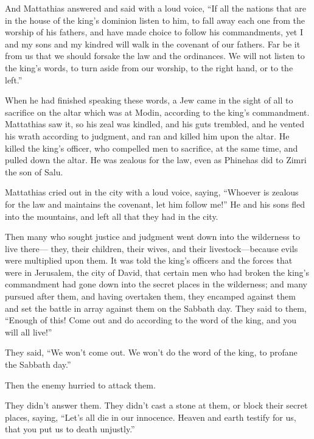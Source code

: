  And Mattathias answered and said with a loud voice, ``If
all the nations that are in the house of the king's dominion listen to
him, to fall away each one from the worship of his fathers, and have
made choice to follow his commandments,  yet I and my
sons and my kindred will walk in the covenant of our fathers.
 Far be it from us that we should forsake the law and the
ordinances.  We will not listen to the king's words, to
turn aside from our worship, to the right hand, or to the left.''

 When he had finished speaking these words, a Jew came in
the sight of all to sacrifice on the altar which was at Modin, according
to the king's commandment.  Mattathias saw it, so his
zeal was kindled, and his guts trembled, and he vented his wrath
according to judgment, and ran and killed him upon the altar.
 He killed the king's officer, who compelled men to
sacrifice, at the same time, and pulled down the altar. 
He was zealous for the law, even as Phinehas did to Zimri the son of
Salu.

 Mattathias cried out in the city with a loud voice,
saying, ``Whoever is zealous for the law and maintains the covenant, let
him follow me!''  He and his sons fled into the
mountains, and left all that they had in the city.

 Then many who sought justice and judgment went down into
the wilderness to live there---  they, their children,
their wives, and their livestock---because evils were multiplied upon
them.  It was told the king's officers and the forces
that were in Jerusalem, the city of David, that certain men who had
broken the king's commandment had gone down into the secret places in
the wilderness;  and many pursued after them, and having
overtaken them, they encamped against them and set the battle in array
against them on the Sabbath day.  They said to them,
``Enough of this! Come out and do according to the word of the king, and
you will all live!''

 They said, ``We won't come out. We won't do the word of
the king, to profane the Sabbath day.''

 Then the enemy hurried to attack them.

 They didn't answer them. They didn't cast a stone at
them, or block their secret places,  saying, ``Let's all
die in our innocence. Heaven and earth testify for us, that you put us
to death unjustly.''

